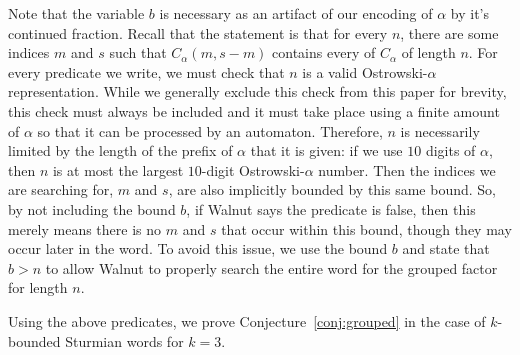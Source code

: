 Note that the variable $b$ is necessary as an artifact of our encoding of $\alpha$ by it's continued fraction.
Recall that the statement is that for every $n$, there are some indices $m$ and $s$ such that $C_{\alpha}(m, s-m)$ contains every \factor of $C_{\alpha}$ of length $n$.
For every predicate we write, we must check that $n$ is a valid Ostrowski-$\alpha$ representation.
While we generally exclude this check from this paper for brevity, this check must always be included and it must take place using a finite amount of $\alpha$ so that it can be processed by an automaton.
Therefore, $n$ is necessarily limited by the length of the prefix of $\alpha$ that it is given: if we use $10$ digits of $\alpha$, then $n$ is at most the largest $10$-digit Ostrowski-$\alpha$ number. 
Then the indices we are searching for, $m$ and $s$, are also implicitly bounded by this same bound.
So, by not including the bound $b$, if Walnut says the predicate is false, then this merely means there is no $m$ and $s$ that occur within this bound, though they may occur later in the word.
To avoid this issue, we use the bound $b$ and state that $b > n$ to allow Walnut to properly search the entire word for the grouped factor for length $n$.

Using the above predicates, we prove Conjecture~\ref{conj:grouped} in the case of $k$-bounded Sturmian words for $k = 3$.
